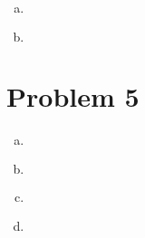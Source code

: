 \documentclass{article}
\begin{document}
\begin{flushleft}
\begin{enumerate}[(a)]
	\item 
\begin{multline*}\\
\end{multline*}

	\item 
\begin{multline*}\\
\end{multline*}

\end{enumerate}

	\section*{Problem 5}
\begin{enumerate}[(a)]
	
	\item 
\begin{multline*}\\
\end{multline*}

	\item 
\begin{multline*}\\
\end{multline*}

	\item 
\begin{multline*}\\
\end{multline*}

	\item 
\begin{multline*}\\
\end{multline*}
	
\end{enumerate}

\end{flushleft}
\end{document}
